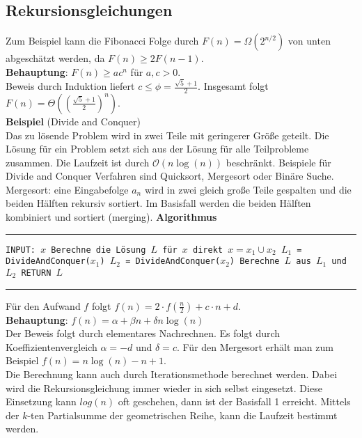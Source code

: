 \documentclass[a4paper, 12pt]{article}
\begin{document}
	\subsection{Rekursionsgleichungen}
	Zum Beispiel kann die Fibonacci Folge durch $F(n) = \Omega(2^{n/2})$ von unten abgeschätzt werden, da $F(n) \geq 2F(n-1)$.\\
	\textbf{Behauptung}: $F(n) \geq ac^n$ für $a,c >0$.\\ Beweis durch Induktion liefert $c \leq \phi = \frac{\sqrt{5}+1}{2}$. Insgesamt folgt $F(n) = \Theta((\frac{\sqrt{5}+1}{2})^n)$.\\
	\textbf{Beispiel} (Divide and Conquer)\\
	Das zu lösende Problem wird in zwei Teile mit geringerer Größe geteilt. Die Lösung für ein Problem setzt sich aus der Lösung für alle Teilprobleme zusammen. Die Laufzeit ist durch $\mathcal{O}(n\log(n))$ beschränkt. Beispiele für Divide and Conquer Verfahren sind Quicksort, Mergesort oder Binäre Suche.\\
	Mergesort: eine Eingabefolge $a_n$ wird in zwei gleich große Teile gespalten und die beiden Hälften rekursiv sortiert. Im Basisfall werden die beiden Hälften kombiniert und sortiert (merging).\newpage
	\textbf{Algorithmus}
	\par\noindent\rule{\textwidth}{0.4pt}
	\begin{algorithmic}
		\State\texttt{INPUT: $x$
			\State Berechne die Lösung $L$ für $x$ direkt
			\Else $x = x_1 \cup x_2$
			\State $L_1$ = DivideAndConquer($x_1$)
			\State $L_2$ = DivideAndConquer($x_2$)
			\State Berechne $L$ aus $L_1$ und $L_2$
			\EndIf
			\State RETURN $L$}
	\end{algorithmic}
	\par\noindent\rule{\textwidth}{0.4pt}
	Für den Aufwand $f$ folgt $f(n) = 2\cdot f(\frac{n}{2}) + c\cdot n + d$.	\\
	\textbf{Behauptung}: $f(n) = \alpha + \beta n +\delta n \log(n)$\\
	Der Beweis folgt durch elementares Nachrechnen. Es folgt durch Koeffizientenvergleich $\alpha = -d$ und $\delta = c$. Für den Mergesort erhält man zum Beispiel $f(n) = n\log(n) - n +1$.\\
	Die Berechnung kann auch durch Iterationsmethode berechnet werden. Dabei wird die Rekursionsgleichung immer wieder in sich selbst eingesetzt. Diese Einsetzung kann $log(n)$ oft geschehen, dann ist der Basisfall 1 erreicht. Mittels der $k$-ten Partialsumme der geometrischen Reihe, kann die Laufzeit bestimmt werden.\\
\end{document}
